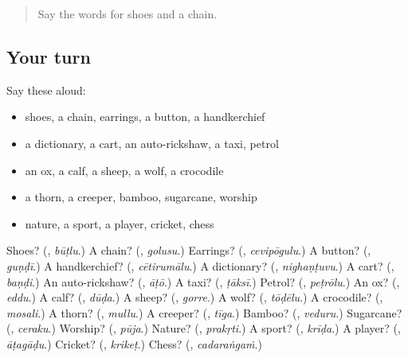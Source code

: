 \label{lesson:TE-R304-second-pass-words-from-chapters-300-304}



\begin{quote}
Say the words for shoes and a chain.
\end{quote}

\subsection*{Your turn}
Say these aloud:

\begin{itemize}
\raggedright
  \item shoes, a chain, earrings, a button, a handkerchief
  \item a dictionary, a cart, an auto-rickshaw, a taxi, petrol
  \item an ox, a calf, a sheep, a wolf, a crocodile
  \item a thorn, a creeper, bamboo, sugarcane, worship
  \item nature, a sport, a player, cricket, chess
\end{itemize}

\begin{tcolorbox}[breakable,colback=teal!4,colframe=teal!35!black,title={Before you move on}]
Shoes? (\textbf{}, \emph{būṭlu}.) A chain? (\textbf{}, \emph{golusu}.) Earrings? (\textbf{}, \emph{cevipōgulu}.) A button? (\textbf{}, \emph{guṇḍī}.) A handkerchief? (\textbf{}, \emph{cētirumālu}.) A dictionary? (\textbf{}, \emph{nighaṇṭuvu}.) A cart? (\textbf{}, \emph{baṇḍi}.) An auto-rickshaw? (\textbf{}, \emph{āṭō}.) A taxi? (\textbf{}, \emph{ṭāksī}.) Petrol? (\textbf{}, \emph{peṭrōlu}.) An ox? (\textbf{}, \emph{eddu}.) A calf? (\textbf{}, \emph{dūḍa}.) A sheep? (\textbf{}, \emph{gorre}.) A wolf? (\textbf{}, \emph{tōḍēlu}.) A crocodile? (\textbf{}, \emph{mosali}.) A thorn? (\textbf{}, \emph{mullu}.) A creeper? (\textbf{}, \emph{tīga}.) Bamboo? (\textbf{}, \emph{veduru}.) Sugarcane? (\textbf{}, \emph{ceraku}.) Worship? (\textbf{}, \emph{pūja}.) Nature? (\textbf{}, \emph{prakṛti}.) A sport? (\textbf{}, \emph{krīḍa}.) A player? (\textbf{}, \emph{āṭagāḍu}.) Cricket? (\textbf{}, \emph{krikeṭ}.) Chess? (\textbf{}, \emph{cadaraṅgaṁ}.)
\end{tcolorbox}
